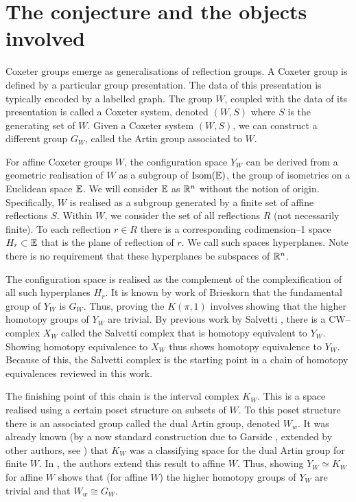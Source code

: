 \documentclass[class=guthesis, crop=false]{standalone}
\begin{document}
\section{The conjecture and the objects involved}
Coxeter groups emerge as generalisations of reflection groups. A Coxeter group is defined by a particular group presentation. The data of this presentation is typically encoded by a labelled graph. The group $W$, coupled with the data of its presentation is called a Coxeter system, denoted $(W,S)$ where $S$ is the generating set of $W$. Given a Coxeter system $(W,S)$, we can construct a different group $G_W$, called the Artin group associated to $W$.

For affine Coxeter groups $W$, the configuration space $Y_W$ can be derived from a geometric realisation of $W$ as a subgroup of $\operatorname{Isom}(\mathbb{E})$, the group of isometries on a Euclidean space $\mathbb{E}$. We will consider $\mathbb{E}$ as $\mathbb{R}^n$ without the notion of origin. Specifically, $W$ is realised as a subgroup generated by a finite set of affine reflections $S$. Within $W$, we consider the set of all reflections $R$ (not necessarily finite). To each reflection $r \in R$ there is a corresponding codimension--1 space $H_r \subset \mathbb{E}$ that is the plane of reflection of $r$. We call such spaces hyperplanes. Note there is no requirement that these hyperplanes be subspaces of $\mathbb{R}^n$.

The configuration space is realised as the complement of the complexification of all such hyperplanes $H_r$. It is known by work of Brieskorn \cite{brieskorn_fundamentalgruppe_1971} that the fundamental group of $Y_W$ is $G_W$. Thus, proving the $K(\pi,1)$ involves showing that the higher homotopy groups of $Y_W$ are trivial. By previous work by Salvetti \cite{salvetti_topology_1987,salvetti_homotopy_1994}, there is a CW--complex $X_W$ called the Salvetti complex that is homotopy equivalent to $Y_W$. Showing homotopy equivalence to $X_W$ thus shows homotopy equivalence to $Y_W$. Because of this, the Salvetti complex is the starting point in a chain of homotopy equivalences reviewed in this work.

The finishing point of this chain is the interval complex $K_W$. This is a space realised using a certain poset structure on subsets of $W$. To this poset structure there is an associated group called the dual Artin group, denoted $W_w$. It was already known (by a now standard construction due to Garside \cite{garside_braid_1969}, extended by other authors, see \cite{charney_etal_bestvina_2002}) that $K_W$ was a classifying space for the dual Artin group for finite $W$. In \cite{paolini_salvetti_kpi1_2021}, the authors extend this result to affine $W$. Thus, showing $Y_W \simeq K_W$ for affine $W$ shows that (for affine $W$) the higher homotopy groups of $Y_W$ are trivial and that $W_w \cong G_W$.
\end{document}
